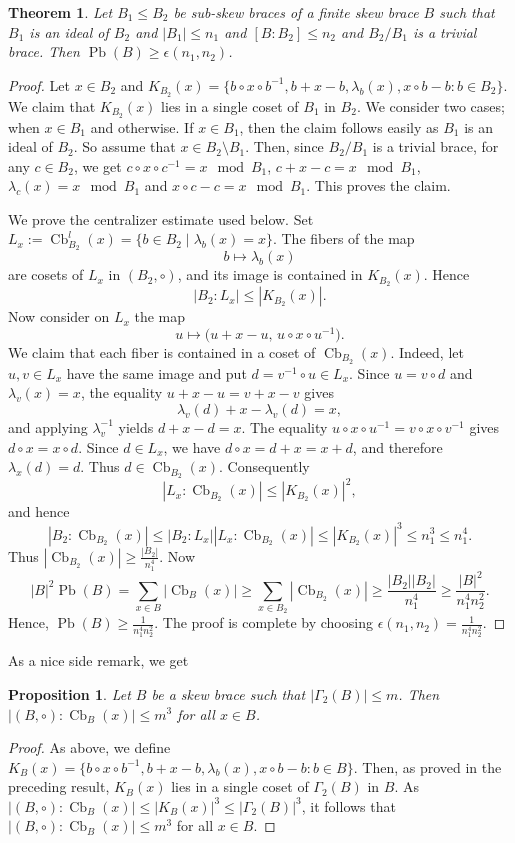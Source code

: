 \documentclass[10pt,a4paper]{amsart}
\numberwithin{equation}{section}
\newtheorem{pro}[equation]{Proposition}
\newtheorem{thm}[equation]{Theorem}
\newcommand{\Cb}{\operatorname{Cb} }
\newcommand{\Pb}{\operatorname{Pb} }
\begin{document}
\begin{thm}
     Let $B_1 \leqslant B_2$ be sub-skew braces of a finite skew brace $B$ such that $B_1$ is an ideal of $B_2$ and $|B_1|\leqslant n_1$ and $[B:B_2]\leqslant n_2$ and $B_2/B_1$ is a trivial brace. Then $\Pb(B)\geqslant \epsilon(n_1,n_2)$.
\end{thm}
\begin{proof}
   Let $x\in B_2$ and $K_{B_2}(x)=\{b\circ x \circ b^{-1},b+ x - b,\lambda_b(x),x\circ b-b:b\in B_2\}$. We claim that $K_{B_2}(x)$ lies in a single coset of $B_1$ in $B_2$. We consider two cases; when $x \in B_1$ and otherwise. If $x \in B_1$, then the claim follows easily as $B_1$ is an ideal of $B_2$. So assume that $x \in B_2 \setminus B_1$. Then, since $B_2/B_1$ is a trivial brace, for any $c \in B_2$, we get
  $c \circ x \circ c^{-1} = x \mod{B_1}$, $c + x - c = x \mod{B_1}$, $\lambda_c(x) = x \mod{B_1}$ and $x \circ c - c = x \mod{B_1}$.
This proves the claim.
  
We prove the centralizer estimate used below. Set $L_x:=\Cb_{B_2}^l(x) = \{b \in B_2 \mid \lambda_b(x) = x\}$. The fibers of the map
\[
 b\longmapsto \lambda_b(x)
\]
are cosets of $L_x$ in $(B_2,\circ)$, and its image is contained in $K_{B_2}(x)$. Hence
\[
|B_2:L_x| \leqslant |K_{B_2}(x)|.
\]
Now consider on $L_x$ the map
\[
u\longmapsto\big(u+x-u,\,u\circ x\circ u^{-1}\big).
\]
We claim that each fiber is contained in a coset of $\Cb_{B_2}(x)$. Indeed, let $u,v\in L_x$ have the same image and put $d=v^{-1}\circ u\in L_x$. Since $u=v\circ d$ and $\lambda_v(x)=x$, the equality $u+x-u=v+x-v$ gives
\[
\lambda_v(d)+x-\lambda_v(d)=x,
\]
and applying $\lambda_v^{-1}$ yields $d+x-d=x$. The equality
$u\circ x\circ u^{-1}=v\circ x\circ v^{-1}$ gives
$d\circ x=x\circ d$. Since $d\in L_x$, we have $d\circ x=d+x=x+d$, and therefore $\lambda_x(d)=d$. Thus $d\in\Cb_{B_2}(x)$. Consequently
\[
|L_x:\Cb_{B_2}(x)|\leqslant |K_{B_2}(x)|^2,
\]
and hence
\[
|B_2:\Cb_{B_2}(x)| \leqslant |B_2:L_x| |L_x:\Cb_{B_2}(x)| \leqslant |K_{B_2}(x)|^3\leqslant n_1^3\leqslant n_1^4.
\]
Thus $|\Cb_{B_2}(x)|\geqslant \frac{|B_2|}{n_1^4}$. Now
   $$|B|^2\Pb(B) = \sum_{x\in B}|\Cb_{B}(x)| \geqslant \sum_{x\in B_2}|\Cb_{B_2}(x)|
      \geqslant \frac{|B_2||B_2|}{n_1^4} \geqslant \frac{|B|^2}{n_1^4n_2^2}.
   $$
   Hence, $\Pb(B)\geqslant \frac{1}{n_1^4n_2^2}$. The proof is complete by choosing $\epsilon(n_1,n_2)=\frac{1}{n_1^4n_2^2}$.
\end{proof}


As a nice side remark, we get
\begin{pro}
    Let $B$ be a skew brace such that $|\Gamma_2(B)|\leqslant m $. Then $|(B,\circ):\Cb_B(x)| \leqslant m^3$ for all $x\in B$.
\end{pro}
\begin{proof}
  As above, we define  $K_{B}(x) =\{b\circ x \circ b^{-1},b+ x - b,\lambda_b(x),x\circ b-b:b\in B\}$. Then, as proved in the preceding result,  $K_{B}(x)$ lies in a single coset of $\Gamma_2(B)$ in $B$. As $|(B,\circ):\Cb_B(x)| \leqslant |K_{B}(x)|^3\leqslant|\Gamma_2(B)|^3$, it follows that $|(B,\circ):\Cb_B(x)| \leqslant m^3$ for all $x\in B$. 
\end{proof}
\end{document}

